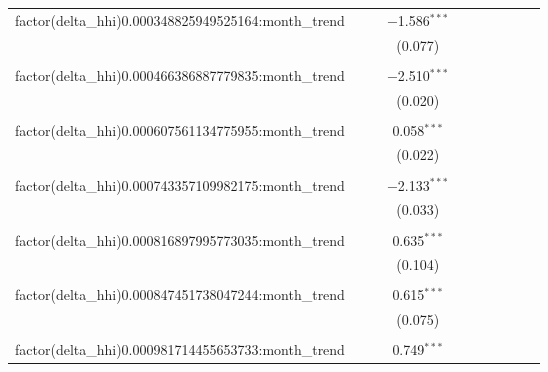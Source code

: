 \begin{table}[H]
{\begin{tabular}{@{\extracolsep{5pt}}lccccccccc}
  factor(delta\_hhi)0.000348825949525164:month\_trend &  &  & $-$1.586$^{***}$ &  &  &  &  &  &  \\  

   &  &  & (0.077) &  &  &  &  &  &  \\  

   & & & & & & & & & \\  

  factor(delta\_hhi)0.000466386887779835:month\_trend &  &  & $-$2.510$^{***}$ &  &  &  &  &  &  \\  

   &  &  & (0.020) &  &  &  &  &  &  \\  

   & & & & & & & & & \\  

  factor(delta\_hhi)0.000607561134775955:month\_trend &  &  & 0.058$^{***}$ &  &  &  &  &  &  \\  

   &  &  & (0.022) &  &  &  &  &  &  \\  

   & & & & & & & & & \\  

  factor(delta\_hhi)0.000743357109982175:month\_trend &  &  & $-$2.133$^{***}$ &  &  &  &  &  &  \\  

   &  &  & (0.033) &  &  &  &  &  &  \\  

   & & & & & & & & & \\  

  factor(delta\_hhi)0.000816897995773035:month\_trend &  &  & 0.635$^{***}$ &  &  &  &  &  &  \\  

   &  &  & (0.104) &  &  &  &  &  &  \\  

   & & & & & & & & & \\  

  factor(delta\_hhi)0.000847451738047244:month\_trend &  &  & 0.615$^{***}$ &  &  &  &  &  &  \\  

   &  &  & (0.075) &  &  &  &  &  &  \\  

   & & & & & & & & & \\  

  factor(delta\_hhi)0.000981714455653733:month\_trend &  &  & 0.749$^{***}$ &  &  &  &  &  &  \\  


\end{tabular}}
\end{table}
